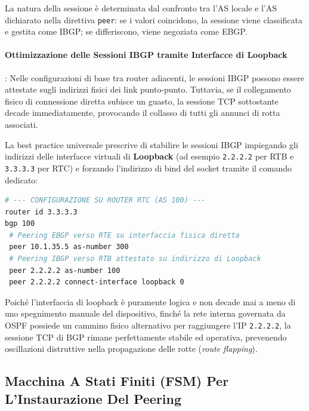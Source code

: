 \documentclass[11pt, a4paper]{article}
\begin{document}

La natura della sessione è determinata dal confronto tra l'AS locale e l'AS dichiarato nella direttiva \texttt{peer}: se i valori coincidono, la sessione viene classificata e gestita come IBGP; se differiscono, viene negoziata come EBGP.


\paragraph{Ottimizzazione delle Sessioni IBGP tramite Interfacce di Loopback}:
Nelle configurazioni di base tra router adiacenti, le sessioni IBGP possono essere attestate sugli indirizzi fisici dei link punto-punto. Tuttavia, se il collegamento fisico di connessione diretta subisce un guasto, la sessione TCP sottostante decade immediatamente, provocando il collasso di tutti gli annunci di rotta associati.

La best practice universale prescrive di stabilire le sessioni IBGP impiegando gli indirizzi delle interfacce virtuali di \textbf{Loopback} (ad esempio \texttt{2.2.2.2} per RTB e \texttt{3.3.3.3} per RTC) e forzando l'indirizzo di bind del socket tramite il comando dedicato:
\begin{lstlisting}[language=bash, caption={Configurazione ottimizzata di sessione BGP con interfaccia di Loopback.}]
# --- CONFIGURAZIONE SU ROUTER RTC (AS 100) ---
router id 3.3.3.3
bgp 100
 # Peering EBGP verso RTE su interfaccia fisica diretta
 peer 10.1.35.5 as-number 300
 # Peering IBGP verso RTB attestato su indirizzo di Loopback
 peer 2.2.2.2 as-number 100
 peer 2.2.2.2 connect-interface loopback 0
\end{lstlisting}
Poiché l'interfaccia di loopback è puramente logica e non decade mai a meno di uno spegnimento manuale del dispositivo, finché la rete interna governata da OSPF possiede un cammino fisico alternativo per raggiungere l'IP \texttt{2.2.2.2}, la sessione TCP di BGP rimane perfettamente stabile ed operativa, prevenendo oscillazioni distruttive nella propagazione delle rotte (\emph{route flapping}).

\subsection{Macchina A Stati Finiti (FSM) Per L'Instaurazione Del Peering}
\end{document}

